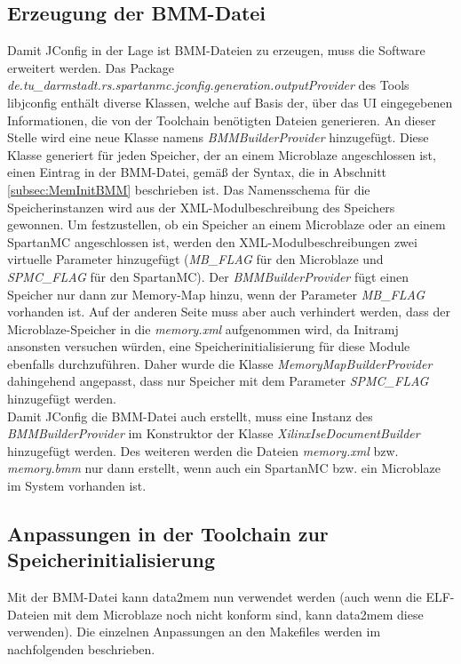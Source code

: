 \subsection{Erzeugung der BMM-Datei}
Damit JConfig in der Lage ist BMM-Dateien zu erzeugen, muss die Software erweitert werden. Das Package \textit{de.tu\_darmstadt.rs.spartanmc.jconfig.generation.outputProvider} des Tools libjconfig enthält diverse Klassen, welche auf Basis der, über das UI eingegebenen Informationen, die von der Toolchain benötigten Dateien generieren. An dieser Stelle wird eine neue Klasse namens \textit{BMMBuilderProvider} hinzugefügt. Diese Klasse generiert für jeden Speicher, der an einem Microblaze angeschlossen ist, einen Eintrag in der BMM-Datei, gemäß der Syntax, die in Abschnitt \ref{subsec:MemInitBMM} beschrieben ist. Das Namensschema für die Speicherinstanzen wird aus der XML-Modulbeschreibung des Speichers gewonnen. Um festzustellen, ob ein Speicher an einem Microblaze oder an einem SpartanMC angeschlossen ist, werden den XML-Modulbeschreibungen zwei virtuelle Parameter hinzugefügt (\textit{MB\_FLAG} für den Microblaze und \textit{SPMC\_FLAG} für den SpartanMC). Der \textit{BMMBuilderProvider} fügt einen Speicher nur dann zur Memory-Map hinzu, wenn der Parameter \textit{MB\_FLAG} vorhanden ist. Auf der anderen Seite muss aber auch verhindert werden, dass der Microblaze-Speicher in die \textit{memory.xml} aufgenommen wird, da Initramj ansonsten versuchen würden, eine Speicherinitialisierung für diese Module ebenfalls durchzuführen. Daher wurde die Klasse \textit{MemoryMapBuilderProvider} dahingehend angepasst, dass nur Speicher mit dem Parameter \textit{SPMC\_FLAG} hinzugefügt werden.\\
Damit JConfig die BMM-Datei auch erstellt, muss eine Instanz des \textit{BMMBuilderProvider} im Konstruktor der Klasse \textit{XilinxIseDocumentBuilder} hinzugefügt werden. Des weiteren werden die Dateien \textit{memory.xml} bzw. \textit{memory.bmm} nur dann erstellt, wenn auch ein SpartanMC bzw. ein Microblaze im System vorhanden ist.

\subsection{Anpassungen in der Toolchain zur Speicherinitialisierung}
Mit der BMM-Datei kann data2mem nun verwendet werden (auch wenn die ELF-Dateien mit dem Microblaze noch nicht konform sind, kann data2mem diese verwenden). Die einzelnen Anpassungen an den Makefiles werden im nachfolgenden beschrieben.
